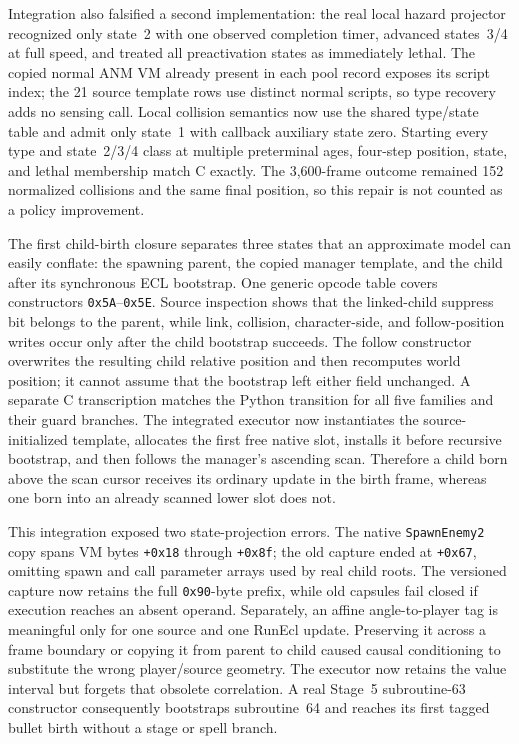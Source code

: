 \documentclass[10pt]{article}
\begin{document}
Integration also falsified a second implementation: the real local hazard
projector recognized only state~2 with one observed completion timer, advanced
states~3/4 at full speed, and treated all preactivation states as immediately
lethal.  The copied normal ANM VM already present in each pool record exposes
its script index; the 21 source template rows use distinct normal scripts, so
type recovery adds no sensing call.  Local collision semantics now use the
shared type/state table and admit only state~1 with callback auxiliary state
zero.  Starting every type and state~2/3/4 class at multiple preterminal ages,
four-step position, state, and lethal membership match C exactly.  The
3,600-frame outcome remained 152 normalized collisions and the same final
position, so this repair is not counted as a policy improvement.

The first child-birth closure separates three states that an approximate
model can easily conflate: the spawning parent, the copied manager template,
and the child after its synchronous ECL bootstrap.  One generic opcode table
covers constructors \texttt{0x5A}--\texttt{0x5E}.  Source inspection shows
that the linked-child suppress bit belongs to the parent, while link,
collision, character-side, and follow-position writes occur only after the
child bootstrap succeeds.  The follow constructor overwrites the resulting
child relative position and then recomputes world position; it cannot assume
that the bootstrap left either field unchanged.  A separate C transcription
matches the Python transition for all five families and their guard branches.
The integrated executor now instantiates the source-initialized template,
allocates the first free native slot, installs it before recursive bootstrap,
and then follows the manager's ascending scan.  Therefore a child born above
the scan cursor receives its ordinary update in the birth frame, whereas one
born into an already scanned lower slot does not.

This integration exposed two state-projection errors.  The native
\texttt{SpawnEnemy2} copy spans VM bytes \texttt{+0x18} through
\texttt{+0x8f}; the old capture ended at \texttt{+0x67}, omitting spawn and
call parameter arrays used by real child roots.  The versioned capture now
retains the full \texttt{0x90}-byte prefix, while old capsules fail closed if
execution reaches an absent operand.  Separately, an affine angle-to-player
tag is meaningful only for one source and one RunEcl update.  Preserving it
across a frame boundary or copying it from parent to child caused causal
conditioning to substitute the wrong player/source geometry.  The executor
now retains the value interval but forgets that obsolete correlation.  A real
Stage~5 subroutine-63 constructor consequently bootstraps subroutine~64 and
reaches its first tagged bullet birth without a stage or spell branch.
\end{document}
